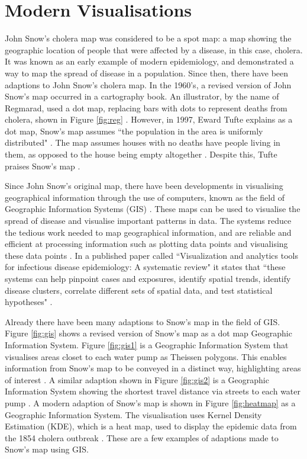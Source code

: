 \documentclass[12pt]{article}
\begin{document}
\section{Modern Visualisations}

John Snow's cholera map was considered to be a spot map: a map showing the geographic location of people that were affected by a disease, in this case, cholera. It was known as an early example of modern epidemiology, and demonstrated a way to map the spread of disease in a population. Since then, there have been adaptions to John Snow's cholera map. In the 1960's, a revised version of John Snow's map occurred in a cartography book. An illustrator, by the name of Regmarad, used a dot map, replacing bars with dots to represent deaths from cholera, shown in Figure \ref{fig:reg}  \cite{ralph}. However, in 1997, Eward Tufte explains as a dot map, Snow's map assumes ``the population in the area is uniformly distributed" \cite{blog}. The map assumes houses with no deaths have people living in them, as opposed to the house being empty altogether \cite{blog}. Despite this, Tufte praises Snow's map \cite{blog}.  

Since John Snow's original map, there have been developments in visualising geographical information through the use of computers, known as the field of Geographic Information Systems (GIS) \cite{howe1970some}. These maps can be used to visualise the spread of disease and visualise important patterns in data. The systems reduce the tedious work needed to map geographical information, and are reliable and efficient at processing information such as plotting data points and visualising these data points \cite{howe1970some}. In a published paper called ``Visualization and analytics tools for infectious disease epidemiology: A systematic review" it states that  ``these systems can help pinpoint cases and exposures, identify spatial trends, identify disease clusters, correlate different sets of spatial data, and test statistical hypotheses" \cite{recent}. 

Already there have been many adaptions to Snow's map in the field of GIS. Figure \ref{fig:gis} shows a revised version of Snow's map as a dot map Geographic Information System. Figure \ref{fig:gis1} is a Geographic Information System that visualises areas closet to each water pump as Theissen polygons. This enables information from Snow's map to be conveyed in a distinct way, highlighting areas of interest \cite{udel2}. A similar adaption shown in Figure \ref{fig:gis2} is a Geographic Information System showing the shortest travel distance via streets to each water pump \cite{udel2}. A modern adaption of Snow's map is shown in Figure \ref{fig:heatmap} as a Geographic Information System. The visualisation uses Kernel Density Estimation (KDE), which is a heat map, used to display the epidemic data from the 1854 cholera outbreak \cite{heatmap}. These are a few examples of adaptions made to Snow's map using GIS. 
\end{document}
